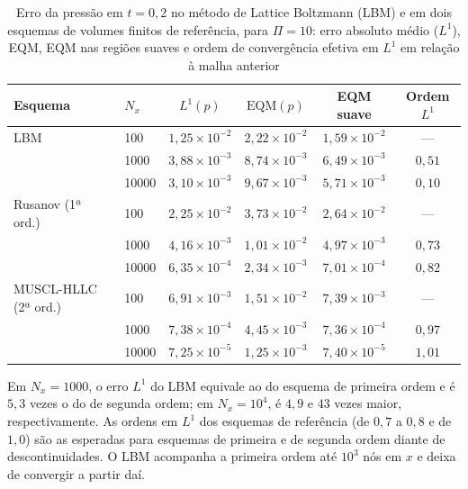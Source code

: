 \begin{table}[H]
    \centering
    \caption{Erro da pressão em \(t = 0{,}2\) no método de Lattice Boltzmann (LBM) e em dois esquemas de volumes finitos de referência, para \(\Pi = 10\): erro absoluto médio (\(L^1\)), EQM, EQM nas regiões suaves e ordem de convergência efetiva em \(L^1\) em relação à malha anterior}
    \label{tab:erro-referencias}
    \footnotesize
    \begin{tabular}{llcccc}
        \toprule
        Esquema & \(N_x\) & \(L^1(p)\) & \(\mathrm{EQM}(p)\) & EQM suave & Ordem \(L^1\) \\
        \midrule
        LBM & 100 & \(1{,}25\times10^{-2}\) & \(2{,}22\times10^{-2}\) & \(1{,}59\times10^{-2}\) & --- \\
         & 1000 & \(3{,}88\times10^{-3}\) & \(8{,}74\times10^{-3}\) & \(6{,}49\times10^{-3}\) & \(0{,}51\) \\
         & 10000 & \(3{,}10\times10^{-3}\) & \(9{,}67\times10^{-3}\) & \(5{,}71\times10^{-3}\) & \(0{,}10\) \\
        \midrule
        Rusanov (1ª ord.) & 100 & \(2{,}25\times10^{-2}\) & \(3{,}73\times10^{-2}\) & \(2{,}64\times10^{-2}\) & --- \\
         & 1000 & \(4{,}16\times10^{-3}\) & \(1{,}01\times10^{-2}\) & \(4{,}97\times10^{-3}\) & \(0{,}73\) \\
         & 10000 & \(6{,}35\times10^{-4}\) & \(2{,}34\times10^{-3}\) & \(7{,}01\times10^{-4}\) & \(0{,}82\) \\
        \midrule
        MUSCL-HLLC (2ª ord.) & 100 & \(6{,}91\times10^{-3}\) & \(1{,}51\times10^{-2}\) & \(7{,}39\times10^{-3}\) & --- \\
         & 1000 & \(7{,}38\times10^{-4}\) & \(4{,}45\times10^{-3}\) & \(7{,}36\times10^{-4}\) & \(0{,}97\) \\
         & 10000 & \(7{,}25\times10^{-5}\) & \(1{,}25\times10^{-3}\) & \(7{,}40\times10^{-5}\) & \(1{,}01\) \\
        \bottomrule
    \end{tabular}
\end{table}

Em \(N_x = 1000\), o erro \(L^1\) do LBM equivale ao do esquema de primeira ordem e é \(5{,}3\) vezes o do de segunda ordem; em \(N_x = 10^4\), é \(4{,}9\) e \(43\) vezes maior, respectivamente.
As ordens em \(L^1\) dos esquemas de referência (de \(0{,}7\) a \(0{,}8\) e de \(1{,}0\)) são as esperadas para esquemas de primeira e de segunda ordem diante de descontinuidades.
O LBM acompanha a primeira ordem até \(10^3\) nós em \(x\) e deixa de convergir a partir daí.

